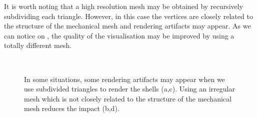 It is worth noting that a high resolution mesh may be obtained by recursively subdividing each triangle. However, in this case the vertices are closely related to the structure of the mechanical mesh and rendering artifacts may appear. As we can notice on , the quality of the visualisation may be improved by using a totally different mesh.
%
%
\begin{figure}[ht]
\centering 
{}
\hfill 
{} \\
\hfill
{}
\caption[Visual artifacts using triangle subdivisions]{In some situations, some rendering artifacts may appear when we use subdivided triangles to render the shells (a,c). Using an irregular mesh which is not closely related to the structure of the mechanical mesh reduces the impact (b,d).}
\label{chap9:fig-rendering}
\end{figure}


